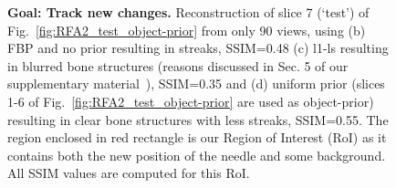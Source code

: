 \documentclass[journal]{IEEEtran}
\begin{document}
\begin{figure}[!h]
\centering
{}\hfill
{}\hfill
{}\hfill
{}
\caption[Representative results-1]{\textbf{Goal: Track new changes.}\small{ Reconstruction of slice 7 (`test') of Fig.~\ref{fig:RFA2_test_object-prior} from only 90 views, using (b) FBP and no prior resulting in streaks, SSIM=0.48 (c) l1-ls resulting in blurred bone structures (reasons discussed in Sec. 5 of our supplementary material~\cite{supp_paper}), SSIM=0.35 and (d) uniform prior (slices 1-6 of Fig.~\ref{fig:RFA2_test_object-prior} are used as object-prior) resulting in clear bone structures with less streaks, SSIM=0.55. The region enclosed in red rectangle is our Region of Interest (RoI) as it contains both the new position of the needle and some background. All SSIM values are computed for this RoI.}}
\label{fig:RFA2_very_few_views}
\end{figure}
\end{document}
